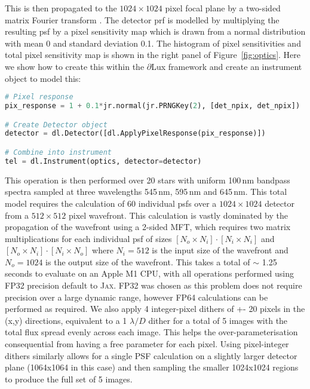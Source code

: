 \documentclass[]{spieman}
\newcommand\jax{\textsc{Jax}\xspace}
\begin{document}
\newpage


This is then propagated to the $1024\times1024$ pixel focal plane by a two-sided matrix Fourier transform \cite{Soummer2007,Martinache2020}. The detector \ac{prf} is modelled by multiplying the resulting \ac{psf} by a pixel sensitivity map which is drawn from a normal distribution with mean 0 and standard deviation 0.1. The histogram of pixel sensitivities and total pixel sensitivity map is shown in the right panel of Figure~\ref{fig:optics}. Here we show how to create this within the $\partial$Lux framework and create an instrument object to model this:

\begin{lstlisting}[language=Python,frame=single]
# Pixel response
pix_response = 1 + 0.1*jr.normal(jr.PRNGKey(2), [det_npix, det_npix])

# Create Detector object
detector = dl.Detector([dl.ApplyPixelResponse(pix_response)])

# Combine into instrument
tel = dl.Instrument(optics, detector=detector)
\end{lstlisting}

This operation is then performed over 20 stars with uniform 100\,nm bandpass spectra sampled at three wavelengths 545\,nm, 595\,nm and 645\,nm. This total model requires the calculation of 60 individual \ac{psf}s over a $1024\times1024$ detector from a $512\times512$ pixel wavefront. This calculation is vastly dominated by the propagation of the wavefront using a 2-sided MFT, which requires two matrix multiplications for each individual \ac{psf} of sizes $[N_o \times N_i] \cdot [N_i \times N_i]$ and $[N_o \times N_i] \cdot [N_i \times N_o]$ where $N_i = 512$ is the input size of the wavefront and $N_o = 1024$ is the output size of the wavefront. This takes a total of $\sim$ 1.25 seconds to evaluate on an Apple M1 CPU, with all operations performed using FP32 precision default to \jax. FP32 was chosen as this problem does not require precision over a large dynamic range, however FP64 calculations can be performed as required. We also apply 4 integer-pixel dithers of +- 20 pixels in the (x,y) directions, equivalent to a 1 $\lambda/D$ dither for a total of 5 images with the total flux spread evenly across each image. This helps the over-parameterisation consequential from having a free parameter for each pixel. Using pixel-integer dithers similarly allows for a single PSF calculation on a slightly larger detector plane (1064x1064 in this case) and then sampling the smaller 1024x1024 regions to produce the full set of 5 images.
\end{document}
